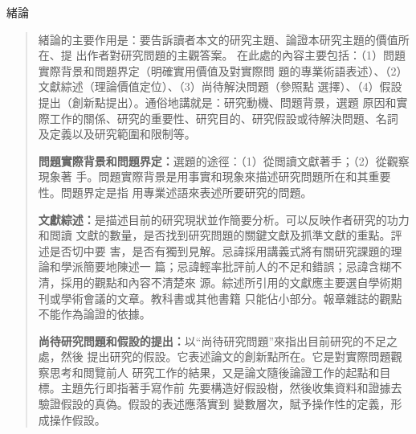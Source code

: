 \documentclass[
    writingLanguage=chinese, %
    addPageTitle=on,  %
    addDeclaration=on, %
    addMUSTlog=off, %
    addFigTOC=on, %
    addTabTOC=on, %
    refIndent=off, %
    printMod=off, %
]{.def/must}
\begin{document}
\noindent\faHandORight 緒論
\begin{quote}
緒論的主要作用是：要告訴讀者本文的研究主題、論證本研究主題的價值所在、提
出作者對研究問題的主觀答案。
在此處的內容主要包括：（1）問題實際背景和問題界定（明確實用價值及對實際問
題的專業術語表述）、（2）文獻綜述（理論價值定位）、（3）尚待解決問題（參照點
選擇）、（4）假設提出（創新點提出）。通俗地講就是：研究動機、問題背景，選題
原因和實際工作的關係、研究的重要性、研究目的、研究假設或待解決問題、名詞
及定義以及研究範圍和限制等。

\textbf{問題實際背景和問題界定：}選題的途徑：（1）從閲讀文獻著手；（2）從觀察現象著
手。問題實際背景是用事實和現象來描述研究問題所在和其重要性。問題界定是指
用專業述語來表述所要研究的問題。

\textbf{文獻綜述：}是描述目前的研究現狀並作簡要分析。可以反映作者研究的功力和閲讀
文獻的數量，是否找到研究問題的關鍵文獻及抓準文獻的重點。評述是否切中要
害，是否有獨到見解。忌諱採用講義式將有關研究課題的理論和學派簡要地陳述一
篇；忌諱輕率批評前人的不足和錯誤；忌諱含糊不清，採用的觀點和內容不清楚來
源。綜述所引用的文獻應主要選自學術期刊或學術會議的文章。教科書或其他書籍
只能佔小部分。報章雜誌的觀點不能作為論證的依據。

\textbf{尚待研究問題和假設的提出：}以“尚待研究問題”來指出目前研究的不足之處，然後
提出研究的假設。它表述論文的創新點所在。它是對實際問題觀察思考和閲覽前人
研究工作的結果，又是論文隨後論證工作的起點和目標。主題先行即指著手寫作前
先要構造好假設樹，然後收集資料和證據去驗證假設的真偽。假設的表述應落實到
變數層次，賦予操作性的定義，形成操作假設。

\end{quote}
\end{document}
